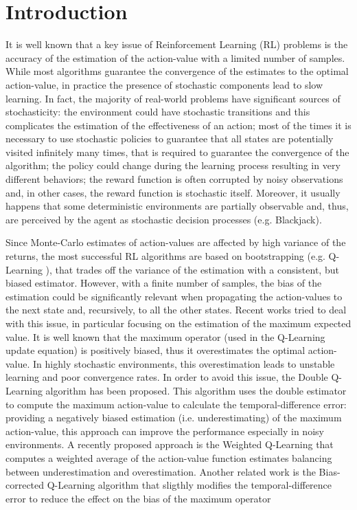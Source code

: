 \documentclass[conference]{IEEEtran}
\begin{document}
\section{Introduction}
It is well known that a key issue of Reinforcement Learning (RL) problems is the accuracy of the estimation of the action-value with a limited number of samples. While most algorithms guarantee the convergence of the estimates to the optimal action-value, in practice the presence of stochastic components lead to slow learning. In fact, the majority of real-world problems have significant sources of stochasticity: the environment could have stochastic transitions and this complicates the estimation of the effectiveness of an action; most of the times it is necessary to use stochastic policies to guarantee that all states are potentially visited infinitely many times, that is required to guarantee the convergence of the algorithm; the policy could change during the learning process resulting in very different behaviors; the reward function is often corrupted by noisy observations and, in other cases, the reward function is stochastic itself. Moreover, it usually happens that some deterministic environments are partially observable and, thus, are perceived by the agent as stochastic decision processes (e.g. Blackjack).

Since Monte-Carlo estimates of action-values are affected by high variance of the returns, the most successful RL algorithms are based on bootstrapping (e.g. Q-Learning \cite{watkins1992q}), that trades off the variance of the estimation with a consistent, but biased estimator. However, with a finite number of samples, the bias of the estimation could be significantly relevant when propagating the action-values to the next state and, recursively, to all the other states. Recent works tried to deal with this issue, in particular focusing on the estimation of the maximum expected value. 
It is well known \cite{smith2006optimizer, van2004rational} that the maximum operator (used in the Q-Learning update equation) is positively biased, thus it overestimates the optimal action-value. In highly stochastic environments, this overestimation leads to unstable learning and poor convergence rates. In order to avoid this issue, the Double Q-Learning algorithm \cite{van2010double} has been proposed. This algorithm uses the double estimator \cite{van2013estimating} to compute the maximum action-value to calculate the temporal-difference error: providing a negatively biased estimation (i.e. underestimating) of the maximum action-value, this approach can improve the performance especially in noisy environments.
A recently proposed approach is the Weighted Q-Learning \cite{d2016estimating} that computes a weighted average of the action-value function estimates balancing between underestimation and overestimation. Another related work is the Bias-corrected Q-Learning algorithm \cite{lee2013bias} that sligthly modifies the temporal-difference error to reduce the effect on the bias of the maximum operator
\end{document}
